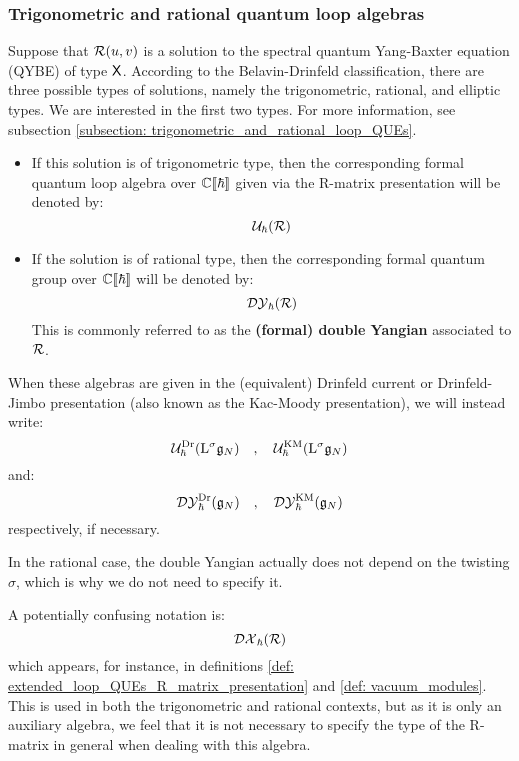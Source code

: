         \subsubsection{Trigonometric and rational quantum loop algebras}
            Suppose that $\mathcal{R}(u, v)$ is a solution to the spectral quantum Yang-Baxter equation (QYBE) of type $\mathsf{X}$. According to the Belavin-Drinfeld classification, there are three possible types of solutions, namely the trigonometric, rational, and elliptic types. We are interested in the first two types. For more information, see subsection \ref{subsection: trigonometric_and_rational_loop_QUEs}.
            \begin{itemize}
                \item If this solution is of trigonometric type, then the corresponding formal quantum loop algebra over $\mathbb{C}[\![\hbar]\!]$ given via the R-matrix presentation will be denoted by:
                    $$\mathcal{U}_{\hbar}(\mathcal{R})$$
                \item If the solution is of rational type, then the corresponding formal quantum group over $\mathbb{C}[\![\hbar]\!]$ will be denoted by:
                    $$\mathcal{DY}_{\hbar}(\mathcal{R})$$
                This is commonly referred to as the \textbf{(formal) double Yangian} associated to $\mathcal{R}$.
            \end{itemize}

            When these algebras are given in the (equivalent) Drinfeld current or Drinfeld-Jimbo presentation (also known as the Kac-Moody presentation), we will instead write:
                $$\mathcal{U}_{\hbar}^{\mathrm{Dr}}(\mathrm{L}^{\sigma}\mathfrak{g}_N) \quad, \quad \mathcal{U}_{\hbar}^{\mathrm{KM}}(\mathrm{L}^{\sigma}\mathfrak{g}_N)$$
            and:
                $$\mathcal{DY}_{\hbar}^{\mathrm{Dr}}(\mathfrak{g}_N) \quad, \quad \mathcal{DY}_{\hbar}^{\mathrm{KM}}(\mathfrak{g}_N)$$
            respectively, if necessary.
            \begin{remark}
                In the rational case, the double Yangian actually does not depend on the twisting $\sigma$, which is why we do not need to specify it.
            \end{remark}

            A potentially confusing notation is:
                $$\mathcal{DX}_{\hbar}(\mathcal{R})$$
            which appears, for instance, in definitions \ref{def: extended_loop_QUEs_R_matrix_presentation} and \ref{def: vacuum_modules}. This is used in both the trigonometric and rational contexts, but as it is only an auxiliary algebra, we feel that it is not necessary to specify the type of the R-matrix in general when dealing with this algebra.

